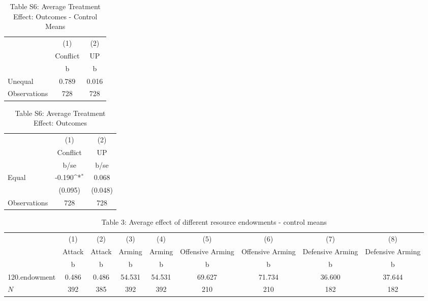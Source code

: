 \begin{table}[htbp]\centering
\def\sym#1{\ifmmode^{#1}\else\(^{#1}\)\fi}
\caption{Table S6: Average Treatment Effect: Outcomes - Control Means}
\begin{tabular}{l*{2}{c}}
\hline\hline
                    &\multicolumn{1}{c}{(1)}&\multicolumn{1}{c}{(2)}\\
                    &\multicolumn{1}{c}{Conflict}&\multicolumn{1}{c}{UP}\\
                    &           b&           b\\
\hline
Unequal             &       0.789&       0.016\\
\hline
Observations        &         728&         728\\
\hline\hline
\end{tabular}
\end{table}
\begin{table}[htbp]\centering
\def\sym#1{\ifmmode^{#1}\else\(^{#1}\)\fi}
\caption{Table S6: Average Treatment Effect: Outcomes}
\begin{tabular}{l*{2}{c}}
\hline\hline
                    &\multicolumn{1}{c}{(1)}&\multicolumn{1}{c}{(2)}\\
                    &\multicolumn{1}{c}{Conflict}&\multicolumn{1}{c}{UP}\\
                    &        b/se         &        b/se         \\
\hline
Equal               &      -0.190\sym{*}  &       0.068         \\
                    &     (0.095)         &     (0.048)         \\
\hline
Observations        &         728         &         728         \\
\hline\hline
\end{tabular}
\end{table}
\begin{table}[htbp]\centering
\def\sym#1{\ifmmode^{#1}\else\(^{#1}\)\fi}
\caption{Table 3: Average effect of different resource endowments - control means}
\begin{tabular}{l*{8}{c}}
\hline\hline
            &\multicolumn{1}{c}{(1)}&\multicolumn{1}{c}{(2)}&\multicolumn{1}{c}{(3)}&\multicolumn{1}{c}{(4)}&\multicolumn{1}{c}{(5)}&\multicolumn{1}{c}{(6)}&\multicolumn{1}{c}{(7)}&\multicolumn{1}{c}{(8)}\\
            &\multicolumn{1}{c}{Attack}&\multicolumn{1}{c}{Attack}&\multicolumn{1}{c}{Arming}&\multicolumn{1}{c}{Arming}&\multicolumn{1}{c}{Offensive Arming}&\multicolumn{1}{c}{Offensive Arming}&\multicolumn{1}{c}{Defensive Arming}&\multicolumn{1}{c}{Defensive Arming}\\
            &           b&           b&           b&           b&           b&           b&           b&           b\\
\hline
120.endowment&       0.486&       0.486&      54.531&      54.531&      69.627&      71.734&      36.600&      37.644\\
\hline
\(N\)       &         392&         385&         392&         392&         210&         210&         182&         182\\
\hline\hline
\end{tabular}
\end{table}
